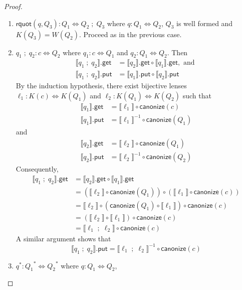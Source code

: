 \documentclass[acmsmall,review,anonymous]{acmart}
\newcommand{\codefont}[1]{\ensuremath{\mathsf{#1}}}
\newcommand{\kw}[1]{\codefont{#1}}
\newcommand{\canonize}{\ensuremath{\kw{canonize}}}
\newcommand{\get}{\ensuremath{\kw{get}}}
\newcommand{\lput}{\ensuremath{\kw{put}}}
\newcommand{\rquot}{\ensuremath{\kw{rquot}}}
\begin{document}
\begin{proof}
\begin{enumerate}
\item
$\rquot(q, Q_3):Q_1 \Leftrightarrow Q_2 \; ; \; Q_3$ where $q : Q_1
\Leftrightarrow Q_2$, $Q_3$ is well formed and $K(Q_3) = W(Q_2)$. Proceed as in
the previous case.
\item
$q_1 \; ; \; q_2: c \Leftrightarrow Q_2$ where $q_1 : c \Leftrightarrow Q_1$ and
$q_2 : Q_1 \Leftrightarrow Q_2$. Then
\begin{align*}
\llbracket q_1 \; ; \; q_2 \rrbracket.\get &= \llbracket q_2
\rrbracket.\get\circ \llbracket q_1 \rrbracket.\get, \text{ and }\\
\llbracket q_1 \; ; \; q_2 \rrbracket.\lput &= \llbracket q_1 \rrbracket.\lput
\circ \llbracket q_2 \rrbracket.\lput
\end{align*}
By the induction hypothesis, there exist bijective lenses
$\ell_1 :
K(c) \Leftrightarrow K(Q_1)$ and $\ell_2 : K(Q_1) \Leftrightarrow K(Q_2)$ such
that
\begin{align*}
\llbracket q_1 \rrbracket.\get &= \llbracket \ell_1 \rrbracket \circ
\canonize(c)\\
\llbracket q_1 \rrbracket.\lput &= {\llbracket \ell_1 \rrbracket}^{-1} \circ
\canonize(Q_1)
\end{align*}
and
\begin{align*}
\llbracket q_2 \rrbracket.\get &= \llbracket \ell_2 \rrbracket \circ
\canonize(Q_1)\\
\llbracket q_2 \rrbracket.\lput &= {\llbracket \ell_2 \rrbracket}^{-1} \circ
\canonize(Q_2)
\end{align*}
Consequently,
\begin{align*}
\llbracket q_1 \; ; \; q_2 \rrbracket.\get &=
\llbracket q_2 \rrbracket.\get \circ \llbracket q_1 \rrbracket.\get \\
&=(\llbracket \ell_2 \rrbracket \circ \canonize(Q_1)) \circ (\llbracket \ell_1
\rrbracket \circ \canonize(c))\\
&= \llbracket \ell_2 \rrbracket \circ (\canonize(Q_1) \circ \llbracket \ell_1
\rrbracket) \circ \canonize(c)\\
&= (\llbracket \ell_2 \rrbracket \circ \llbracket \ell_1 \rrbracket) \circ
\canonize(c)\\
&= \llbracket \ell_1 \; ; \; \ell_2 \rrbracket \circ
\canonize(c)
\end{align*}
A similar argument shows that
$$\llbracket q_1 \; ; \; q_2 \rrbracket.\lput =
\llbracket \ell_1 \; ; \; \ell_2 \rrbracket^{-1} \circ
\canonize(c)$$
\item
$q^* : {Q_1}^* \Leftrightarrow {Q_2}^*$ where $q : Q_1 \Leftrightarrow Q_2$,

\end{enumerate}
\end{proof}
\end{document}
